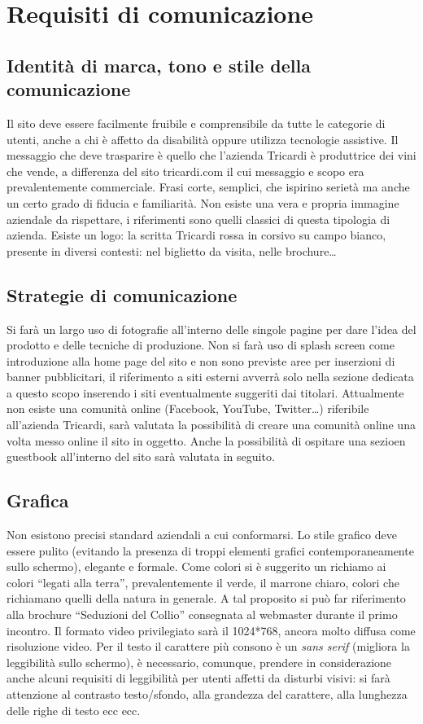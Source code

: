 \documentclass[a4paper]{report}	%
\begin{document}
\section{Requisiti di comunicazione}
\subsection{Identità di marca, tono e stile della comunicazione}
Il sito deve essere facilmente fruibile e comprensibile da tutte le categorie di utenti, anche a chi è affetto da disabilità oppure utilizza tecnologie assistive. Il messaggio che deve trasparire è quello che l'azienda Tricardi è produttrice dei vini che vende, a differenza del sito tricardi.com il cui messaggio e scopo era prevalentemente commerciale. Frasi corte, semplici, che ispirino serietà ma anche un certo grado di fiducia e familiarità. 
Non esiste una vera e propria immagine aziendale da rispettare, i riferimenti sono quelli classici di questa tipologia di azienda. Esiste un logo: la scritta Tricardi rossa in corsivo su campo bianco, presente in diversi contesti: nel biglietto da visita, nelle brochure\ldots 
\subsection{Strategie di comunicazione}
Si farà un largo uso di fotografie all'interno delle singole pagine per dare l'idea del prodotto e delle tecniche di produzione.
Non si farà uso di splash screen come introduzione alla home page del sito e non sono previste aree per inserzioni di banner pubblicitari, il riferimento a siti esterni avverrà solo nella sezione dedicata a questo scopo inserendo i siti eventualmente suggeriti dai titolari.
Attualmente non esiste una comunità online (Facebook, YouTube, Twitter\ldots) riferibile all'azienda Tricardi, sarà valutata la possibilità di creare una comunità online una volta messo online il sito in oggetto. Anche la possibilità di ospitare una sezioen guestbook all'interno del sito sarà valutata in seguito.
\subsection{Grafica}
Non esistono precisi standard aziendali a cui conformarsi. Lo stile grafico deve essere pulito (evitando la presenza di troppi elementi grafici contemporaneamente sullo schermo), elegante e formale. Come colori si è suggerito un richiamo ai colori ``legati alla terra'', prevalentemente il verde, il marrone chiaro, colori che richiamano quelli della natura in generale. A tal proposito si può far riferimento alla brochure ``Seduzioni del Collio'' consegnata al webmaster durante il primo incontro.
Il formato video privilegiato sarà il 1024*768, ancora molto diffusa come risoluzione video.
Per il testo il carattere più consono è un \textit{sans serif} (migliora la leggibilità sullo schermo), è necessario, comunque, prendere in considerazione anche alcuni requisiti di leggibilità per utenti affetti da disturbi visivi: si farà attenzione al contrasto testo/sfondo, alla grandezza del carattere, alla lunghezza delle righe di testo ecc ecc.
\end{document}
